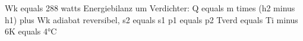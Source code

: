 Wk equals 288 watts  
Energiebilanz um Verdichter:  
Q equals m times (h2 minus h1) plus Wk  
adiabat reversibel, s2 equals s1  
p1 equals p2  
Tverd equals Ti minus 6K equals 4°C